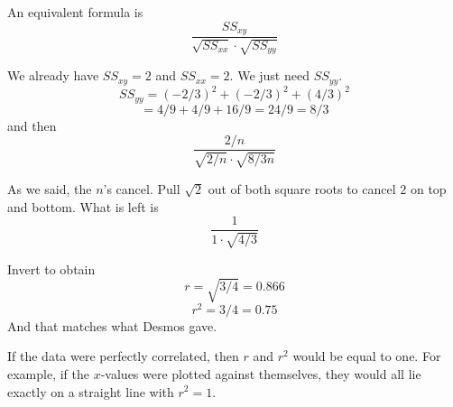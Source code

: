 \documentclass[11pt, oneside]{article}
\begin{document}
An equivalent formula is
\[ \frac{SS_{xy}}{\sqrt{SS_{xx}} \cdot \sqrt{SS_{yy}}} \]

We already have $SS_{xy} = 2$ and $SS_{xx} = 2$.  We just need $SS_{yy}$.
\[ SS_{yy} = (-2/3)^2 + (-2/3)^2 + (4/3)^2 \]
\[ = 4/9 + 4/9 + 16/9 = 24/9 = 8/3 \]
and then
\[ \frac{2/n}{\sqrt{2/n} \cdot \sqrt{8/3n}} \]

As we said, the $n$'s cancel.  Pull $\sqrt{2}$ out of both square roots to cancel $2$ on top and bottom.  What is left is
\[ \frac{1}{1 \cdot \sqrt{4/3}} \]

Invert to obtain 
\[ r = \sqrt{3/4} = 0.866 \]
\[ r^2 = 3/4 = 0.75 \]
And that matches what Desmos gave.

If the data were perfectly correlated, then $r$ and $r^2$ would be equal to one.  For example, if the $x$-values were plotted against themselves, they would all lie exactly on a straight line with $r^2 = 1$.
\end{document}
